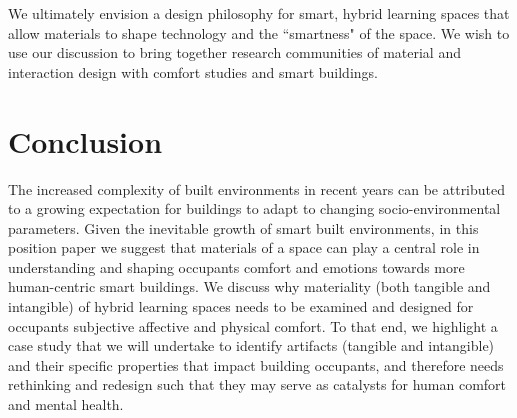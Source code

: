 \documentclass[manuscript, anonymous, review]{acmart}
\begin{document}
We ultimately envision a design philosophy for smart, hybrid learning spaces that allow materials to shape technology and the ``smartness" of the space. We wish to use our discussion to bring together research communities of material and interaction design with comfort studies and smart buildings.


\section{Conclusion}
The increased complexity of built environments in recent years can be attributed to a growing expectation for buildings to adapt to changing socio-environmental parameters. Given the inevitable growth of smart built environments, in this position paper we suggest that materials of a space can play a central role in understanding and shaping occupants comfort and emotions towards more human-centric smart buildings. We discuss why materiality (both tangible and intangible) of hybrid learning spaces needs to be examined and designed for occupants subjective affective and physical comfort. To that end, we highlight a case study that we will undertake to identify artifacts (tangible and intangible) and their specific properties that impact building occupants, and therefore needs rethinking and  redesign such that they may serve as catalysts for human comfort and mental health. 



\end{document}
